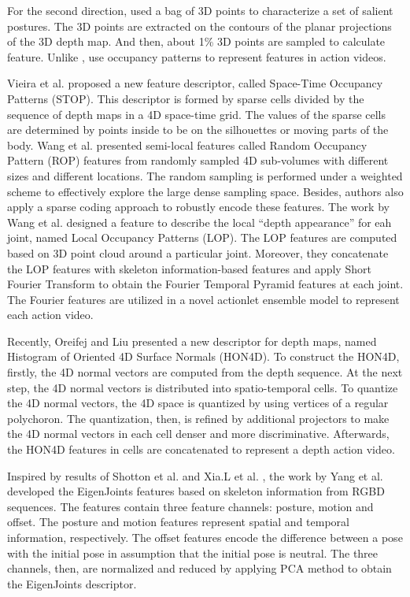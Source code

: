 \documentclass[review]{elsarticle}
\begin{document}
For the second direction, \cite{li2010action} used a bag of 3D points to characterize a set of salient postures. The 3D points are extracted on the contours of the planar projections of the 3D depth map. And then, about 1\% 3D points are sampled to calculate feature. Unlike \cite{li2010action}, \cite{vieira2012stop, wang2012robust, wang2012mining} use occupancy patterns to represent features in action videos.

Vieira et al. \cite{vieira2012stop} proposed a new feature descriptor, called Space-Time Occupancy Patterns (STOP). This descriptor is formed by sparse cells divided by the sequence of depth maps in a 4D space-time grid. The values of the sparse cells are determined by points inside to be on the silhouettes or moving parts of the body. Wang et al. \cite{wang2012robust} presented semi-local features called Random Occupancy Pattern (ROP) features from randomly sampled 4D sub-volumes with different sizes and different locations. The random sampling is performed under a weighted scheme to effectively explore the large dense sampling space. Besides, authors also apply a sparse coding approach to robustly encode these features. The work by Wang et al. \cite{wang2012mining} designed a feature to describe the local ``depth appearance'' for eah joint, named Local Occupancy Patterns (LOP). The LOP features are computed based on 3D point cloud around a particular joint. Moreover, they concatenate the LOP features with skeleton information-based features and apply Short Fourier Transform to obtain the Fourier Temporal Pyramid features at each joint. The Fourier features are utilized in a novel actionlet ensemble model to represent each action video.

Recently, Oreifej and Liu \cite{oreifej2013hon4d} presented a new descriptor for depth maps, named Histogram of Oriented 4D Surface Normals (HON4D). To construct the HON4D, firstly, the 4D normal vectors are computed from the depth sequence. At the next step, the 4D normal vectors is distributed into spatio-temporal cells. To quantize the 4D normal vectors, the 4D space is quantized by using vertices of a regular polychoron. The quantization, then, is refined by additional projectors to make the 4D normal vectors in each cell denser and more discriminative. Afterwards, the HON4D features in cells are concatenated to represent a depth action video.

Inspired by results of Shotton et al. \cite{shotton2013real} and Xia.L et al. \cite{xia2011human}, the work by Yang et al. \cite{yang2012eigenjoints} developed the EigenJoints features based on skeleton information from RGBD sequences. The features contain three feature channels: posture, motion and offset. The posture and motion features represent spatial and temporal information, respectively. The offset features encode the difference between a pose with the initial pose in assumption that the initial pose is neutral. The three channels, then, are normalized and reduced by applying PCA method to obtain the EigenJoints descriptor.
\end{document}
